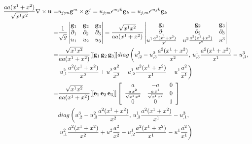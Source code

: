 \documentclass[UTF8,zihao=5]{ctexart}
\newcommand{\bm}[1]{{\mathbf{#1}}}
\begin{document}
\begin{equation}
    \begin{aligned}
        \frac{aa(x^1+x^2)}{\sqrt{x^1x^2}}
        \nabla\times\uu
        = & u_{j;m}\g^m\times\g^j
        =u_{j;m}\epsilon^{mjk}\g_k
        =u_{j,m}\epsilon^{mjk}\g_k                           \\
        = & \frac{1}{\sqrt{g}}\left|
        \begin{matrix}
            \g_1       & \g_2       & \g_3       \\
            \partial_1 & \partial_2 & \partial_3 \\
            u_1        & u_2        & u_3
        \end{matrix}
        \right|
        =\frac{\sqrt{x^1x^2}}{aa(x^1+x^2)}
        \left|
        \begin{matrix}
            \g_1                        & \g_2                        & \g_3       \\
            \partial_1                  & \partial_2                  & \partial_3 \\
            u^1\frac{a^2(x^1+x^2)}{x^1} & u^2\frac{a^2(x^1+x^2)}{x^2} & u^3
        \end{matrix}
        \right|                                              \\
        = & \frac{\sqrt{x^1x^2}}{aa(x^1+x^2)}
        [[\g_1\,\g_2\,\g_3]]
        diag\left(
        u^3_{,2}-u^2_{,3}\frac{a^2(x^1+x^2)}{x^2},\,
        u^1_{,3}\frac{a^2(x^1+x^2)}{x^1}-u^3_{,1},\, \right. \\
          & \left.
        u^2_{,1}\frac{a^2(x^1+x^2)}{x^2}+u^2\frac{a^2}{x^2}
        -
        u^1_{,2}\frac{a^2(x^1+x^2)}{x^1}-u^1\frac{a^2}{x^1}
        \right)                                              \\
        = & \frac{\sqrt{x^1x^2}}{aa(x^1+x^2)}
        [[\bm{e}_1\,\bm{e}_2\,\bm{e}_3]]
        \left[\begin{array}{ccc} a & -a & 0\\ \frac{a\,x^{2}}{\sqrt{x^{1}\,x^{2}}} & \frac{a\,x^{1}}{\sqrt{x^{1}\,x^{2}}} & 0\\ 0 & 0 & 1 \end{array}\right]              \\
          & diag\left(
        u^3_{,2}-u^2_{,3}\frac{a^2(x^1+x^2)}{x^2},\,
        u^1_{,3}\frac{a^2(x^1+x^2)}{x^1}-u^3_{,1},\, \right. \\
          & \left.
        u^2_{,1}\frac{a^2(x^1+x^2)}{x^2}+u^2\frac{a^2}{x^2}
        -
        u^1_{,2}\frac{a^2(x^1+x^2)}{x^1}-u^1\frac{a^2}{x^1}
        \right)
    \end{aligned}
    \label{eq:curlu}
\end{equation}
\end{document}

